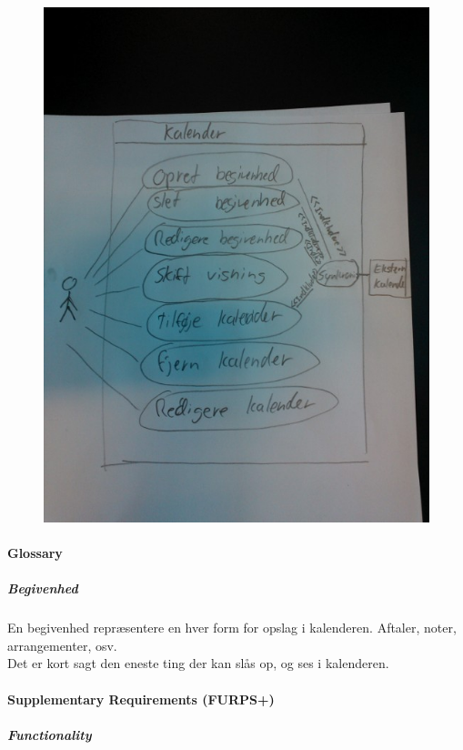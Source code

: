\documentclass{article}
\begin{document}
   
   \begin{figure}[h]
	\caption{}   
   \centering
   \includegraphics[scale=1.5]{WP_000143.jpg}
   \end{figure}
   
   \paragraph{Glossary} \mbox{}
	\subparagraph{Begivenhed} \mbox{}
	
	En begivenhed repræsentere en hver form for opslag i kalenderen. Aftaler, noter, arrangementer, osv. \\
	Det er kort sagt den eneste ting der kan slås op, og ses i kalenderen.
	
	
   
   \paragraph{Supplementary Requirements (FURPS+)} \mbox{}
   \subparagraph{Functionality} \mbox{}
   
\end{document}
